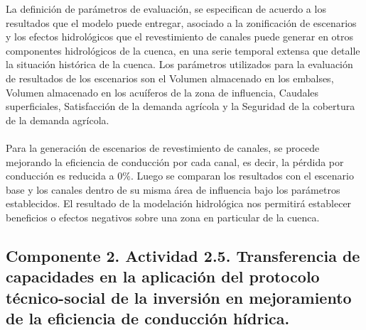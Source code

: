 \documentclass[]{article}
\begin{document}
La definición de parámetros de evaluación, se especifican de acuerdo a los resultados que el modelo puede entregar, asociado a la zonificación de escenarios y los efectos hidrológicos que el revestimiento de canales puede generar en otros componentes hidrológicos de la cuenca, en una serie temporal extensa que detalle la situación histórica de la cuenca. Los parámetros utilizados para la evaluación de resultados de los escenarios son el Volumen almacenado en los embalses, Volumen almacenado en los acuíferos de la zona de influencia, Caudales superficiales, Satisfacción de la demanda agrícola y la Seguridad de la cobertura de la demanda agrícola. \\
\\
Para la generación de escenarios de revestimiento de canales, se procede mejorando la eficiencia de conducción por cada canal, es decir, la pérdida por conducción es reducida a 0\%. Luego se comparan los resultados con el escenario base y los canales dentro de su misma área de influencia bajo los parámetros establecidos. El resultado de la modelación hidrológica nos permitirá establecer beneficios o efectos negativos sobre una zona en particular de la cuenca.
\clearpage
\subsection{Componente 2. Actividad 2.5. Transferencia de capacidades en la aplicación del protocolo técnico-social de la inversión en mejoramiento de la eficiencia de conducción hídrica.} \label{aplicación_protocolo}
\end{document}
